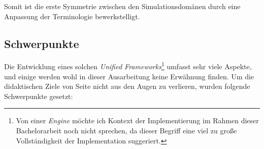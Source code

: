 Somit ist die erste Symmetrie zwischen den Simulationsdomänen durch eine Anpassung der Terminologie bewerkstelligt.





\subsection{Schwerpunkte}

Die Entwicklung eines solchen \emph{Unified Frameworks}\footnote{Von einer \emph{Engine} möchte ich Kontext der Implementierung im Rahmen dieser Bachelorarbeit noch nicht sprechen, da dieser Begriff eine viel zu große Vollständigkeit der Implementation suggeriert.} umfasst sehr viele Aspekte, und einige werden wohl in dieser Ausarbeitung keine Erwähnung finden. Um die didaktischen Ziele von Seite \pageref{list:didacticGoals} nicht aus den Augen zu verlieren, wurden folgende Schwerpunkte gesetzt:

